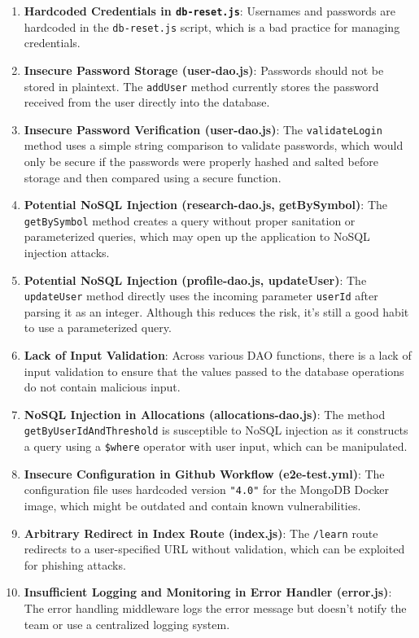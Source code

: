 \begin{enumerate}
    \item \textbf{Hardcoded Credentials in \texttt{db-reset.js}}: Usernames and passwords are hardcoded in the \texttt{db-reset.js} script, which is a bad practice for managing credentials.
    \item \textbf{Insecure Password Storage (user-dao.js)}: Passwords should not be stored in plaintext. The \texttt{addUser} method currently stores the password received from the user directly into the database.
    \item \textbf{Insecure Password Verification (user-dao.js)}: The \texttt{validateLogin} method uses a simple string comparison to validate passwords, which would only be secure if the passwords were properly hashed and salted before storage and then compared using a secure function.
    \item \textbf{Potential NoSQL Injection (research-dao.js, getBySymbol)}: The \texttt{getBySymbol} method creates a query without proper sanitation or parameterized queries, which may open up the application to NoSQL injection attacks.
    \item \textbf{Potential NoSQL Injection (profile-dao.js, updateUser)}: The \texttt{updateUser} method directly uses the incoming parameter \texttt{userId} after parsing it as an integer. Although this reduces the risk, it's still a good habit to use a parameterized query.
    \item \textbf{Lack of Input Validation}: Across various DAO functions, there is a lack of input validation to ensure that the values passed to the database operations do not contain malicious input.
    \item \textbf{NoSQL Injection in Allocations (allocations-dao.js)}: The method \texttt{getByUserIdAndThreshold} is susceptible to NoSQL injection as it constructs a query using a \texttt{\$where} operator with user input, which can be manipulated.
    \item \textbf{Insecure Configuration in Github Workflow (e2e-test.yml)}: The configuration file uses hardcoded version \texttt{"4.0"} for the MongoDB Docker image, which might be outdated and contain known vulnerabilities.
    \item \textbf{Arbitrary Redirect in Index Route (index.js)}: The \texttt{/learn} route redirects to a user-specified URL without validation, which can be exploited for phishing attacks.
    \item \textbf{Insufficient Logging and Monitoring in Error Handler (error.js)}: The error handling middleware logs the error message but doesn't notify the team or use a centralized logging system.

\end{enumerate}
